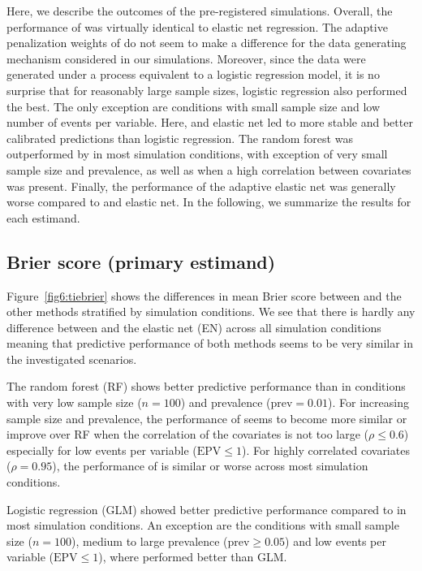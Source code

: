 \begin{subappendices}
Here, we describe the outcomes of the pre-registered simulations. Overall, the
performance of \ainet{} was virtually identical to elastic net regression. The
adaptive penalization weights of \ainet{} do not seem to make a difference for
the data generating mechanism considered in our simulations. Moreover, since the
data were generated under a process equivalent to a logistic regression model,
it is no surprise that for reasonably large sample sizes, logistic regression
also performed the best. The only exception are conditions with small sample
size and low number of events per variable. Here, \ainet{} and elastic net led
to more stable and better calibrated predictions than logistic regression. The
random forest was outperformed by \ainet{} in most simulation conditions, with
exception of very small sample size and prevalence, as well as when a high
correlation between covariates was present. Finally, the performance of the
adaptive elastic net was generally worse compared to \ainet{} and elastic net.
In the following, we summarize the results for each estimand.

\subsection{Brier score (primary estimand)}

Figure~\ref{fig6:tiebrier} shows the differences in mean Brier score between
\ainet{} and the other methods stratified by simulation conditions. We see that
there is hardly any difference between \ainet{} and the elastic net (EN) across
all simulation conditions meaning that predictive performance of both methods
seems to be very similar in the investigated scenarios.

The random forest (RF) shows better predictive performance than \ainet{} in
conditions with very low sample size ($n = 100$) and prevalence
($\mbox{prev} = 0.01$). For increasing sample size and prevalence, the
performance of \ainet{} seems to become more similar or improve over RF when the
correlation of the covariates is not too large ($\rho \leq 0.6$) especially for
low events per variable ($\mbox{EPV} \leq 1$). For highly correlated covariates
($\rho = 0.95$), the performance of \ainet{} is similar or worse across most
simulation conditions.

Logistic regression (GLM) showed better predictive performance compared to
\ainet{} in most simulation conditions. An exception are the conditions with
small sample size ($n = 100$), medium to large prevalence
($\mbox{prev} \geq 0.05$) and low events per variable ($\mbox{EPV} \leq 1$),
where \ainet{} performed better than GLM.


\end{subappendices}
